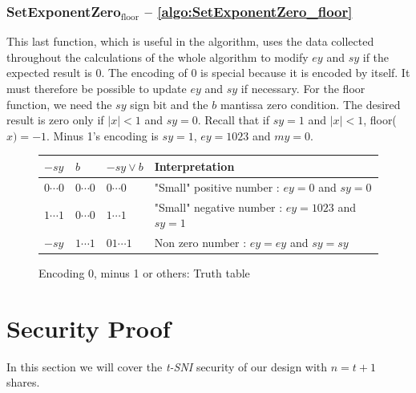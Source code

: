 \documentclass[runningheads]{llncs}
\begin{document}
    \subsubsection{SetExponentZero$_\text{floor}$ -- \autoref{algo:SetExponentZero_floor}}

    This last function, which is useful in the algorithm, uses the data collected throughout the calculations of the whole algorithm to modify $ey$ and $sy$ if the expected result is 0.
      The encoding of $0$ is special because it is encoded by itself. It must therefore be possible to update $ey$ and $sy$ if necessary. 
      For the floor function, we need the $sy$ sign bit and the $b$ mantissa zero condition.
      The desired result is zero only if $\mid x \mid <1$ and $sy=0$. Recall that if $sy=1$ and $\mid x \mid <1$, floor($x)=-1$. 
      Minus 1's encoding is $sy = 1$, $ey = 1023$ and $my = 0$.

      \begin{figure}
        \begin{center}
            \begin{tabular}{C{1.2cm} C{1.2cm} || C{2 cm} C{7.5cm}}
                \toprule
                 $-sy$ & $b$ &$-sy \vee b$ & Interpretation\\
                \midrule
                $0\cdots0$ & $0\cdots0$ & $0\cdots0$ & "Small" positive number : $ey = 0$ and $sy = 0$  \\
                $1\cdots1$ & $0\cdots0$ & $1\cdots1$ & "Small" negative number : $ey = 1023$ and $sy = 1$\\ 
                $-sy$ & $1\cdots1$ & $01\cdots1$ & Non zero number : $ey = ey$ and $sy=sy$\\
                \bottomrule
            \end{tabular}
        \end{center}
        \caption{Encoding 0, minus 1 or others: Truth table}
        \label{figure:flooradjust2}
    \end{figure}

\section{Security Proof}
In this section we will cover the \emph{t-SNI} security of our design with $n=t+1$ shares.
\end{document}
